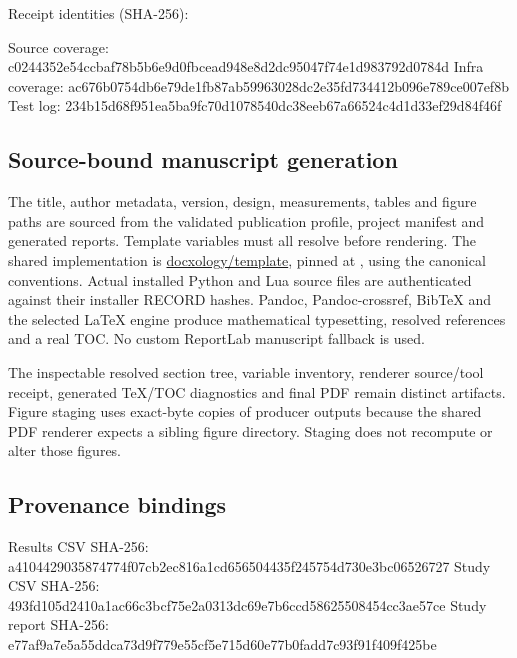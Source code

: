 \documentclass[
  english,
  11pt,
]{article}
\newenvironment{Shaded}{}{}
\newcommand{\NormalTok}[1]{#1}
\begin{document}
Receipt identities (SHA-256):

\begingroup\small

\begin{Shaded}
\begin{Highlighting}[]
\NormalTok{Source coverage: c0244352e54ccbaf78b5b6e9d0fbcead948e8d2dc95047f74e1d983792d0784d}
\NormalTok{Infra coverage:  ac676b0754db6e79de1fb87ab59963028dc2e35fd734412b096e789ce007ef8b}
\NormalTok{Test log:        234b15d68f951ea5ba9fc70d1078540dc38eeb67a66524c4d1d33ef29d84f46f}
\end{Highlighting}
\end{Shaded}

\endgroup

\subsection{Source-bound manuscript
generation}\label{source-bound-manuscript-generation}

The title, author metadata, version, design, measurements, tables and
figure paths are sourced from the validated publication profile, project
manifest and generated reports. Template variables must all resolve
before rendering. The shared implementation is
\href{https://github.com/docxology/template}{docxology/template}, pinned
at , using the
canonical 
conventions. Actual installed Python and Lua source files are
authenticated against their installer RECORD hashes. Pandoc,
Pandoc-crossref, BibTeX and the selected LaTeX engine produce
mathematical typesetting, resolved references and a real TOC. No custom
ReportLab manuscript fallback is used.

The inspectable resolved section tree, variable inventory, renderer
source/tool receipt, generated TeX/TOC diagnostics and final PDF remain
distinct artifacts. Figure staging uses exact-byte copies of producer
outputs because the shared PDF renderer expects a sibling figure
directory. Staging does not recompute or alter those figures.

\subsection{Provenance bindings}\label{provenance-bindings}

\begingroup\small

\begin{Shaded}
\begin{Highlighting}[]
\NormalTok{Results CSV SHA{-}256: a4104429035874774f07cb2ec816a1cd656504435f245754d730e3bc06526727}
\NormalTok{Study CSV SHA{-}256: 493fd105d2410a1ac66c3bcf75e2a0313dc69e7b6ccd58625508454cc3ae57ce}
\NormalTok{Study report SHA{-}256: e77af9a7e5a55ddca73d9f779e55cf5e715d60e77b0fadd7c93f91f409f425be}
\end{Highlighting}
\end{Shaded}
\end{document}
